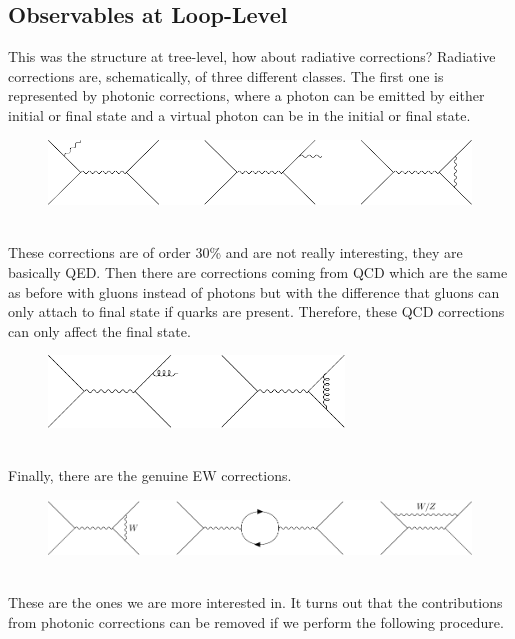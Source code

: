 \documentclass[../main.tex]{subfiles}
\begin{document}
\subsection{Observables at Loop-Level}
This was the structure at tree-level, how about radiative corrections? Radiative corrections are, schematically, of three different classes.
The first one is represented by photonic corrections, where a photon can be emitted by either initial or final state and a virtual photon can be in the initial or final state.
\begin{figure}[h]
    \centering
    \includegraphics{Images/corr1.pdf}
    \caption*{}
\end{figure}\\
These corrections are of order 30\% and are not really interesting, they are basically QED. Then there are corrections coming from QCD which are the same as before with gluons instead of photons but with the difference that gluons can only attach to final state if quarks are present. Therefore, these QCD corrections can only affect the final state.
\begin{figure}[h]
    \centering
    \includegraphics[width=0.7\textwidth]{Images/corr2.pdf}
    \caption*{}
\end{figure}\\
\newline
Finally, there are the genuine EW corrections.
\begin{figure}[h]
    \centering
    \includegraphics{Images/corr3.pdf}
    \caption*{}
\end{figure}\\
These are the ones we are more interested in. It turns out that the contributions from photonic corrections can be removed if we perform the following procedure.
\end{document}
